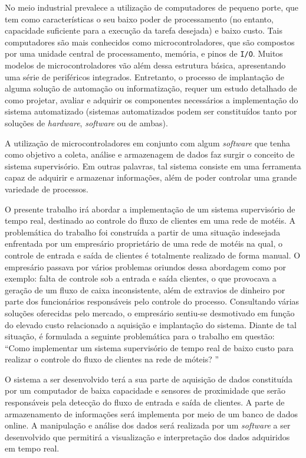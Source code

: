 No meio industrial prevalece a utilização de computadores de pequeno porte, que tem como características o seu baixo poder de processamento 
(no entanto, capacidade suficiente para a execução da tarefa desejada) e baixo custo. Tais computadores são mais conhecidos como microcontroladores,
que são compostos por uma unidade central de processamento, memória, e pinos de \texttt{I/O}. Muitos modelos de microcontroladores vão além 
dessa estrutura básica, apresentando uma série de periféricos integrados. Entretanto, o processo de implantação de alguma solução de automação 
ou informatização, requer um estudo detalhado de como projetar, avaliar e adquirir os componentes necessários a implementação do sistema automatizado 
(sistemas automatizados podem ser constituídos tanto por soluções de \textit{hardware}, \textit{software} ou de ambas).

  	A utilização de microcontroladores em conjunto com algum \textit{software} que tenha como objetivo a coleta, análise e armazenagem de 
  	dados faz surgir o conceito de sistema supervisório. Em outras palavras, tal sistema consiste em uma ferramenta capaz de adquirir e armazenar
  	informações, além de poder controlar uma grande variedade de processos. 

O presente trabalho irá abordar a implementação de um sistema supervisório de tempo real, destinado ao controle do fluxo de clientes em uma 
rede de motéis. A problemática do trabalho foi construída a partir de uma situação indesejada enfrentada por um empresário proprietário de uma
rede de motéis na qual, o controle de entrada e saída de clientes é totalmente realizado de forma manual. O empresário passava por vários problemas 
oriundos dessa abordagem como por exemplo: falta de controle sob a entrada e saída clientes, o que provocava a geração de um fluxo de caixa 
inconsistente, além de extravios de dinheiro por parte dos funcionários responsáveis pelo controle do processo. Consultando várias soluções 
oferecidas pelo mercado, o empresário sentiu-se desmotivado em função do elevado custo relacionado a aquisição e implantação do sistema. 
Diante de tal situação, é formulada a seguinte problemática para o trabalho em questão: 
“Como implementar um sistema supervisório de tempo real de baixo custo para realizar o controle do fluxo de clientes na rede de móteis? ” 

	O sistema a ser desenvolvido terá a sua parte de aquisição de dados constituída por um computador de baixa capacidade e sensores de 
	proximidade que serão responsáveis pela detecção do fluxo de entrada e saída de clientes. A parte de armazenamento de informações será
	implementa por meio de um banco de dados online. A manipulação e análise dos dados será realizada por um \textit{software} a ser 
	desenvolvido que permitirá a visualização e interpretação dos dados adquiridos em tempo real.
